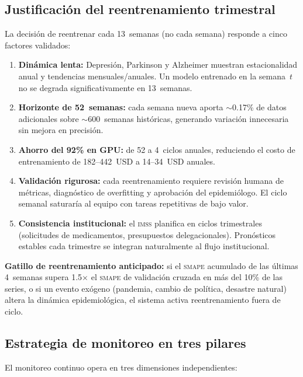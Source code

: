 \documentclass[12pt, letterpaper]{article}
\newenvironment{criticalbox}[1][]{\par\medskip\begin{lrbox}{\boxcontents}\begin{minipage}{\dimexpr\textwidth-12pt}\setlength{\emergencystretch}{5em}\setlength{\parskip}{6pt}}{\end{minipage}\end{lrbox}\noindent\colorbox{lightred}{\usebox{\boxcontents}}\par\medskip}
\newcommand{\smape}{\textnormal{\textsc{smape}}}
\newcommand{\imss}{\textnormal{\textsc{imss}}}
\begin{document}
\subsection{Justificación del reentrenamiento trimestral}

La decisión de reentrenar cada 13~semanas (no cada semana) responde a cinco factores validados:

\begin{enumerate}
  \item \textbf{Dinámica lenta:} Depresión, Parkinson y Alzheimer muestran estacionalidad anual y tendencias mensuales/anuales. Un modelo entrenado en la semana~$t$ no se degrada significativamente en 13~semanas.
  \item \textbf{Horizonte de 52~semanas:} cada semana nueva aporta $\sim$0.17\% de datos adicionales sobre $\sim$600~semanas históricas, generando variación innecesaria sin mejora en precisión.
  \item \textbf{Ahorro del 92\% en GPU:} de 52 a 4~ciclos anuales, reduciendo el costo de entrenamiento de 182--442~USD a 14--34~USD anuales.
  \item \textbf{Validación rigurosa:} cada reentrenamiento requiere revisión humana de métricas, diagnóstico de overfitting y aprobación del epidemiólogo. El ciclo semanal saturaría al equipo con tareas repetitivas de bajo valor.
  \item \textbf{Consistencia institucional:} el \imss{} planifica en ciclos trimestrales (solicitudes de medicamentos, presupuestos delegacionales). Pronósticos estables cada trimestre se integran naturalmente al flujo institucional.
\end{enumerate}

\begin{criticalbox}
\textbf{Gatillo de reentrenamiento anticipado:} si el \smape{} acumulado de las últimas 4~semanas supera 1.5$\times$ el \smape{} de validación cruzada en más del 10\% de las series, o si un evento exógeno (pandemia, cambio de política, desastre natural) altera la dinámica epidemiológica, el sistema activa reentrenamiento fuera de ciclo.
\end{criticalbox}

\subsection{Estrategia de monitoreo en tres pilares}

El monitoreo continuo opera en tres dimensiones independientes:
\end{document}
